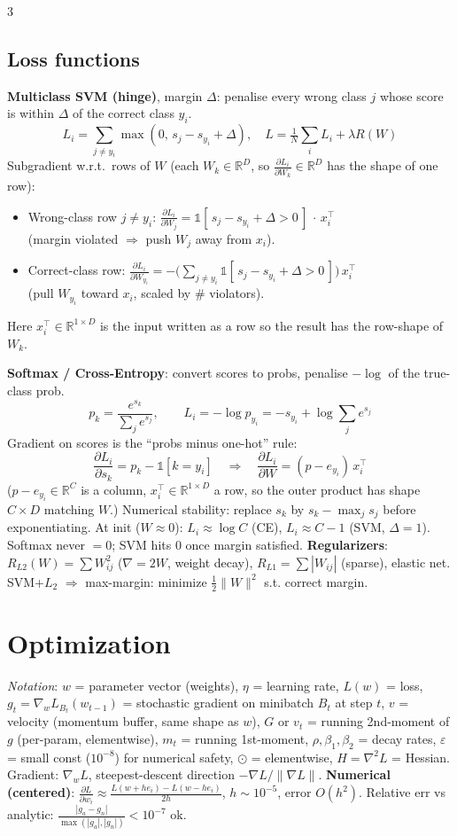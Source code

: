 \documentclass[a4paper,9pt,landscape]{scrartcl}
\newcommand{\R}{\mathbb{R}}
\newcommand{\dd}[2]{\frac{\partial #1}{\partial #2}}
\begin{document}
\begin{multicols*}{3}
\subsection{Loss functions}
\textbf{Multiclass SVM (hinge)}, margin $\Delta$: penalise every wrong class $j$ whose score is within $\Delta$ of the correct class $y_i$.
$$L_i=\sum_{j\neq y_i}\max(0,\,s_j-s_{y_i}+\Delta),\quad L=\tfrac1N\!\sum_i L_i+\lambda R(W)$$
Subgradient w.r.t.\ rows of $W$ (each $W_k\!\in\!\R^D$, so $\dd{L_i}{W_k}\!\in\!\R^D$ has the shape of one row):
\begin{itemize}
\item Wrong-class row $j\!\neq\!y_i$:\; $\dd{L_i}{W_j}=\mathbb{1}[\,s_j-s_{y_i}+\Delta>0\,]\,\cdot\,x_i^\top$ \\(margin violated $\Rightarrow$ push $W_j$ away from $x_i$).
\item Correct-class row:\; $\dd{L_i}{W_{y_i}}=-\big(\sum_{j\neq y_i}\mathbb{1}[\,s_j-s_{y_i}+\Delta>0\,]\big)\,x_i^\top$ \\(pull $W_{y_i}$ toward $x_i$, scaled by \# violators).
\end{itemize}
Here $x_i^\top\!\in\!\R^{1\times D}$ is the input written as a row so the result has the row-shape of $W_k$.

\textbf{Softmax / Cross-Entropy}: convert scores to probs, penalise $-\log$ of the true-class prob.
$$p_k=\frac{e^{s_k}}{\sum_j e^{s_j}},\qquad L_i=-\log p_{y_i}=-s_{y_i}+\log\!\sum_j e^{s_j}$$
Gradient on scores is the ``probs minus one-hot'' rule:
$$\dd{L_i}{s_k}=p_k-\mathbb{1}[k{=}y_i]\quad\Rightarrow\quad\dd{L_i}{W}=(p-e_{y_i})\,x_i^\top$$
($p-e_{y_i}\!\in\!\R^C$ is a column, $x_i^\top\!\in\!\R^{1\times D}$ a row, so the outer product has shape $C\!\times\!D$ matching $W$.)
Numerical stability: replace $s_k$ by $s_k-\max_j s_j$ before exponentiating.
At init ($W\!\approx\!0$): $L_i\approx\log C$ (CE), $L_i\approx C-1$ (SVM, $\Delta{=}1$). Softmax never $=0$; SVM hits $0$ once margin satisfied.
\textbf{Regularizers}: $R_{L2}(W)=\sum W_{ij}^2$ ($\nabla = 2W$, weight decay), $R_{L1}=\sum|W_{ij}|$ (sparse), elastic net.
SVM+$L_2$ $\Rightarrow$ max-margin: minimize $\tfrac12\|W\|^2$ s.t. correct margin.

\section{Optimization}
\textit{Notation}: $w$ = parameter vector (weights), $\eta$ = learning rate, $L(w)$ = loss, $g_t{=}\nabla_w L_{B_t}(w_{t-1})$ = stochastic gradient on minibatch $B_t$ at step $t$, $v$ = velocity (momentum buffer, same shape as $w$), $G$ or $v_t$ = running 2nd-moment of $g$ (per-param, elementwise), $m_t$ = running 1st-moment, $\rho,\beta_1,\beta_2$ = decay rates, $\varepsilon$ = small const ($10^{-8}$) for numerical safety, $\odot$ = elementwise, $H{=}\nabla^2 L$ = Hessian.
Gradient: $\nabla_w L$, steepest-descent direction $-\nabla L/\|\nabla L\|$.
\textbf{Numerical (centered)}: $\dd{L}{w_i}\!\approx\!\frac{L(w+he_i)-L(w-he_i)}{2h}$, $h{\sim}10^{-5}$, error $O(h^2)$. Relative err vs analytic: $\frac{|g_a-g_n|}{\max(|g_a|,|g_n|)}<10^{-7}$ ok.


\end{multicols*}
\end{document}
